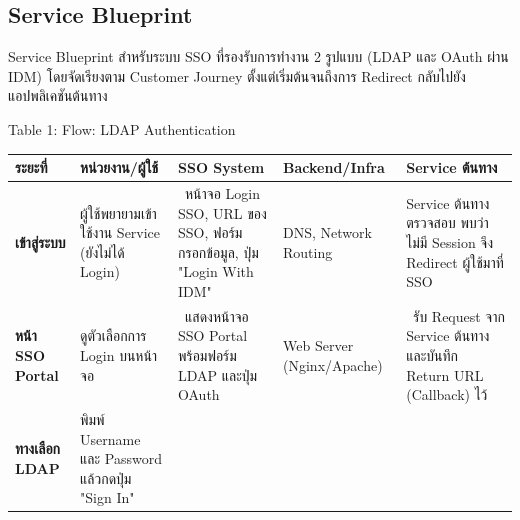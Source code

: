 \subsection{Service Blueprint}

Service Blueprint สำหรับระบบ SSO ที่รองรับการทำงาน 2 รูปแบบ (LDAP และ OAuth ผ่าน IDM) โดยจัดเรียงตาม Customer Journey ตั้งแต่เริ่มต้นจนถึงการ Redirect กลับไปยังแอปพลิเคชันต้นทาง

Table 1: Flow: LDAP Authentication

\begin{tabular}{|p{3cm}|p{3cm}|p{3cm}|p{3cm}|p{3cm}|}
\hline
\textbf{ระยะที่} & \textbf{หน่วยงาน/ผู้ใช้} & \textbf{SSO System} & \textbf{Backend/Infra} & \textbf{Service ต้นทาง} \\
\hline
\textbf{เข้าสู่ระบบ} & \begin{minipage}[t]{2.5cm}\raggedright
ผู้ใช้พยายามเข้าใช้งาน Service (ยังไม่ได้ Login)
\end{minipage} & \begin{minipage}[t]{2.5cm}\raggedright
\ หน้าจอ Login SSO, URL ของ SSO, ฟอร์มกรอกข้อมูล, ปุ่ม "Login With IDM"
\end{minipage} & \begin{minipage}[t]{2.5cm}\raggedright
DNS, Network Routing
\end{minipage} & \begin{minipage}[t]{2.5cm}\raggedright
Service ต้นทางตรวจสอบ พบว่าไม่มี Session จึง Redirect ผู้ใช้มาที่ SSO
\end{minipage} \\
\hline
\textbf{หน้า SSO Portal} & \begin{minipage}[t]{2.5cm}\raggedright
ดูตัวเลือกการ Login บนหน้าจอ
\end{minipage} & \begin{minipage}[t]{2.5cm}\raggedright
\ แสดงหน้าจอ SSO Portal พร้อมฟอร์ม LDAP และปุ่ม OAuth
\end{minipage} & \begin{minipage}[t]{2.5cm}\raggedright
Web Server (Nginx/Apache)
\end{minipage} & \begin{minipage}[t]{2.5cm}\raggedright
\ รับ Request จาก Service ต้นทางและบันทึก Return URL (Callback) ไว้
\end{minipage} \\
\hline
\textbf{ทางเลือก LDAP} & \begin{minipage}[t]{2.5cm}\raggedright
พิมพ์ Username และ Password แล้วกดปุ่ม "Sign In"
\end{minipage} & \begin{minipage}[t]{2.5cm}\raggedright

\end{minipage}
\end{tabular}
